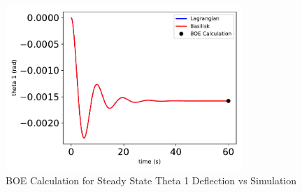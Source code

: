 \begin{figure}[htbp]\centerline{\includegraphics[width=0.8\textwidth]{AutoTeX/BOECalculationForSteadyStateTheta1DeflectionVsSimulation}}\caption{BOE Calculation for Steady State Theta 1 Deflection vs Simulation}\label{fig:BOECalculationForSteadyStateTheta1DeflectionVsSimulation}\end{figure}